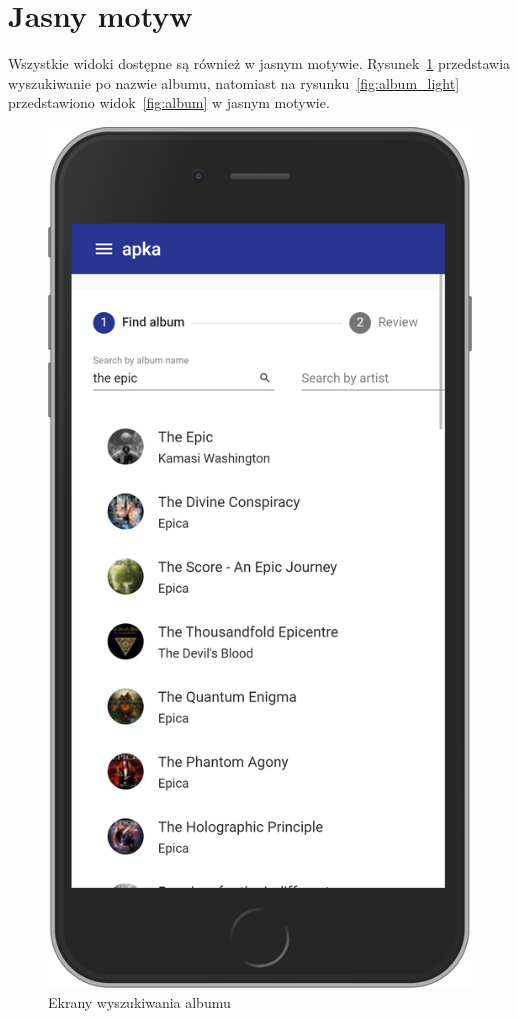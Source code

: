 \section{Jasny motyw}
	Wszystkie widoki dostępne są również w jasnym motywie.
	Rysunek~\ref{fig:search_light} przedstawia wyszukiwanie po nazwie albumu,
	natomiast na rysunku~\ref{fig:album_light} przedstawiono widok~\ref{fig:album} w jasnym motywie.
	\begin{figure}[H]
		\centering
		\begin{minipage}{.5\textwidth}
			\centering
			\includegraphics[width=0.75\linewidth]{rys07/search_light.png}
			\caption{Ekrany wyszukiwania albumu}
			\label{fig:search_light}
		\end{minipage}%
		\begin{minipage}{0.5\textwidth}

\end{minipage}
\end{figure}
